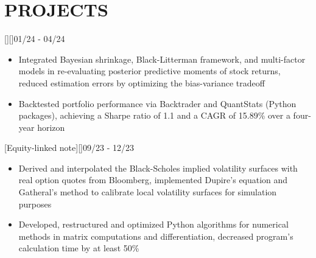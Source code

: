 \documentclass[cmu]{resume}
\begin{document}

    \section{PROJECTS}
    [][]{01/24 - 04/24}
    \begin{itemize}
        \item Integrated Bayesian shrinkage, Black-Litterman framework, and multi-factor models in re-evaluating posterior predictive moments of stock returns, reduced estimation errors by optimizing the bias-variance tradeoff
        \item Backtested portfolio performance via Backtrader and QuantStats (Python packages), achieving a Sharpe ratio of 1.1 and a CAGR of 15.89\% over a four-year horizon
    \end{itemize}

    [Equity-linked note][]{09/23 - 12/23}
    \begin{itemize}
        \item Derived and interpolated the Black-Scholes implied volatility surfaces with real option quotes from Bloomberg, implemented Dupire's equation and Gatheral's method to calibrate local volatility surfaces for simulation purposes
        \item Developed, restructured and optimized Python algorithms for numerical methods in matrix computations and differentiation, decreased program's calculation time by at least 50\%
    \end{itemize}

\end{document}
